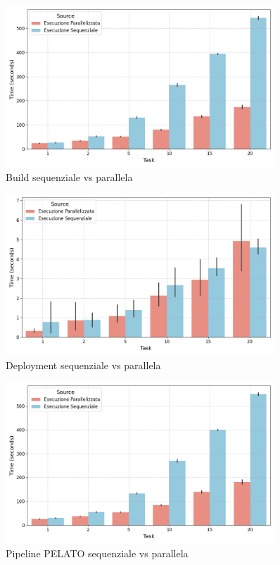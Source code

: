 \FloatBarrier
\begin{figure}[ht!]
    \centering
    \includegraphics[width=0.9\textwidth]{img/plots/build_time_paired_barplot.png}
    \caption{Build sequenziale vs parallela}
    \label{fig:test_seq_par_build}
\end{figure}
\FloatBarrier

\FloatBarrier
\begin{figure}[ht!]
    \centering
    \includegraphics[width=0.9\textwidth]{img/plots/deploy_time_paired_barplot.png}
    \caption{Deployment sequenziale vs parallela}
    \label{fig:test_seq_par_deploy}
\end{figure}
\FloatBarrier

\FloatBarrier
\begin{figure}[ht!]
    \centering
    \includegraphics[width=0.9\textwidth]{img/plots/total_time_paired_barplot.png}
    \caption{Pipeline PELATO sequenziale vs parallela}
    \label{fig:test_seq_par_total}
\end{figure}
\FloatBarrier

